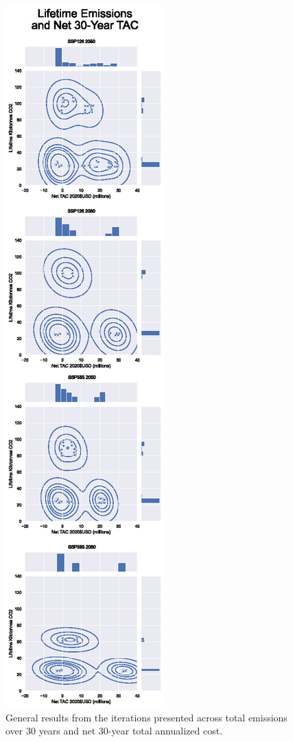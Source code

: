 \documentclass[twocolumn, a4paper,10pt]{article}
\begin{document}
\begin{figure}[hbpt]
    \centering
    \includegraphics[scale=1.0]{figures/general_results.eps}
    \caption{General results from the iterations presented across total emissions over 30 years and net 30-year total annualized cost.}
    \label{fig:cross_plot}
\end{figure}
\end{document}
